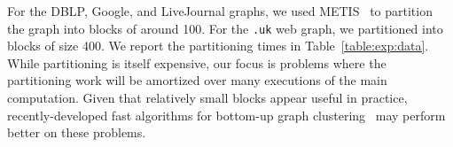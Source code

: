 %
%
%
For the DBLP, Google, and LiveJournal graphs, we used
METIS~\cite{KarypisAKS97:METIS} to partition the graph into blocks of
around 100.  For the {\tt .uk} web graph, we partitioned into blocks
of size 400.  We report the partitioning times in
Table~{\ref{table:exp:data}}.  While partitioning is itself expensive,
our focus is problems where the partitioning work will be amortized
over many executions of the main computation.  Given that relatively
small blocks appear useful in practice, recently-developed fast
algorithms for bottom-up graph
clustering~\cite{Spielman13:LocalCluster} may perform better on these
problems.

